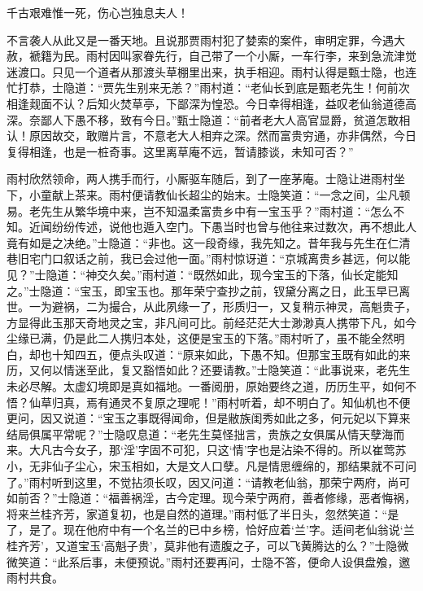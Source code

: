 \begin{poem}
    \begin{pl}
        千古艰难惟一死，伤心岂独息夫人！
    \end{pl}
\end{poem}


\begin{parag}
    不言袭人从此又是一番天地。且说那贾雨村犯了婪索的案件，审明定罪，今遇大赦，褫籍为民。雨村因叫家眷先行，自己带了一个小厮，一车行李，来到急流津觉迷渡口。只见一个道者从那渡头草棚里出来，执手相迎。雨村认得是甄士隐，也连忙打恭，士隐道：“贾先生别来无恙？”雨村道：“老仙长到底是甄老先生！何前次相逢觌面不认？后知火焚草亭，下鄙深为惶恐。今日幸得相逢，益叹老仙翁道德高深。奈鄙人下愚不移，致有今日。”甄士隐道：“前者老大人高官显爵，贫道怎敢相认！原因故交，敢赠片言，不意老大人相弃之深。然而富贵穷通，亦非偶然，今日复得相逢，也是一桩奇事。这里离草庵不远，暂请膝谈，未知可否？”
\end{parag}


\begin{parag}
    雨村欣然领命，两人携手而行，小厮驱车随后，到了一座茅庵。士隐让进雨村坐下，小童献上茶来。雨村便请教仙长超尘的始末。士隐笑道：“一念之间，尘凡顿易。老先生从繁华境中来，岂不知温柔富贵乡中有一宝玉乎？”雨村道：“怎么不知。近闻纷纷传述，说他也遁入空门。下愚当时也曾与他往来过数次，再不想此人竟有如是之决绝。”士隐道：“非也。这一段奇缘，我先知之。昔年我与先生在仁清巷旧宅门口叙话之前，我已会过他一面。”雨村惊讶道：“京城离贵乡甚远，何以能见？”士隐道：“神交久矣。”雨村道：“既然如此，现今宝玉的下落，仙长定能知之。”士隐道：“宝玉，即宝玉也。那年荣宁查抄之前，钗黛分离之日，此玉早已离世。一为避祸，二为撮合，从此夙缘一了，形质归一，又复稍示神灵，高魁贵子，方显得此玉那天奇地灵之宝，非凡间可比。前经茫茫大士渺渺真人携带下凡，如今尘缘已满，仍是此二人携归本处，这便是宝玉的下落。”雨村听了，虽不能全然明白，却也十知四五，便点头叹道：“原来如此，下愚不知。但那宝玉既有如此的来历，又何以情迷至此，复又豁悟如此？还要请教。”士隐笑道：“此事说来，老先生未必尽解。太虚幻境即是真如福地。一番阅册，原始要终之道，历历生平，如何不悟？仙草归真，焉有通灵不复原之理呢！”雨村听着，却不明白了。知仙机也不便更问，因又说道：“宝玉之事既得闻命，但是敝族闺秀如此之多，何元妃以下算来结局俱属平常呢？”士隐叹息道：“老先生莫怪拙言，贵族之女俱属从情天孽海而来。大凡古今女子，那‘淫’字固不可犯，只这‘情’字也是沾染不得的。所以崔莺苏小，无非仙子尘心，宋玉相如，大是文人口孽。凡是情思缠绵的，那结果就不可问了。”雨村听到这里，不觉拈须长叹，因又问道：“请教老仙翁，那荣宁两府，尚可如前否？”士隐道：“福善祸淫，古今定理。现今荣宁两府，善者修缘，恶者悔祸，将来兰桂齐芳，家道复初，也是自然的道理。”雨村低了半日头，忽然笑道：“是了，是了。现在他府中有一个名兰的已中乡榜，恰好应着‘兰’字。适间老仙翁说‘兰桂齐芳’，又道宝玉‘高魁子贵’，莫非他有遗腹之子，可以飞黄腾达的么？”士隐微微笑道：“此系后事，未便预说。”雨村还要再问，士隐不答，便命人设俱盘飧，邀雨村共食。
\end{parag}


